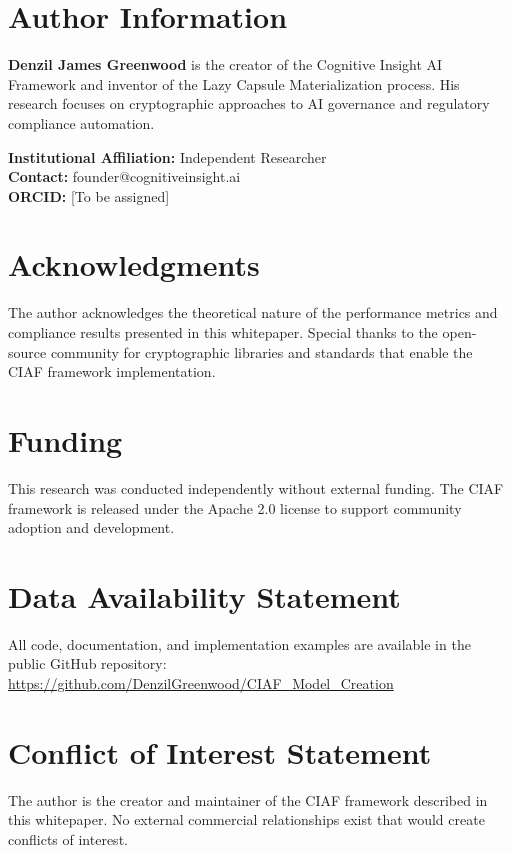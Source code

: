 \documentclass[12pt,a4paper]{article}
\begin{document}
\newpage

\section*{Author Information}

\textbf{Denzil James Greenwood} is the creator of the Cognitive Insight AI Framework and inventor of the Lazy Capsule Materialization process. His research focuses on cryptographic approaches to AI governance and regulatory compliance automation.

\textbf{Institutional Affiliation:} Independent Researcher \\
\textbf{Contact:} founder@cognitiveinsight.ai \\
\textbf{ORCID:} [To be assigned]

\section*{Acknowledgments}

The author acknowledges the theoretical nature of the performance metrics and compliance results presented in this whitepaper. Special thanks to the open-source community for cryptographic libraries and standards that enable the CIAF framework implementation.

\section*{Funding}

This research was conducted independently without external funding. The CIAF framework is released under the Apache 2.0 license to support community adoption and development.

\section*{Data Availability Statement}

All code, documentation, and implementation examples are available in the public GitHub repository: \url{https://github.com/DenzilGreenwood/CIAF_Model_Creation}

\section*{Conflict of Interest Statement}

The author is the creator and maintainer of the CIAF framework described in this whitepaper. No external commercial relationships exist that would create conflicts of interest.
\end{document}
